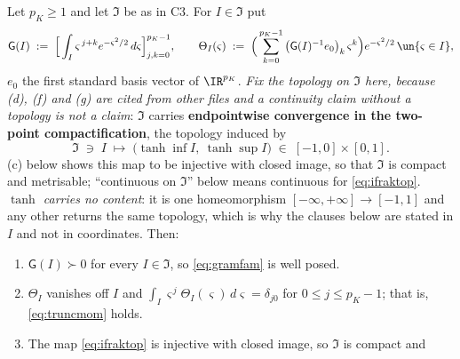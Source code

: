 \begin{lemma}\label{lem:bdryfam}
Let $p_K\ge1$ and let $\mathfrak I$ be as in C3. For $I\in\mathfrak I$ put
\begin{equation}\label{eq:gramfam}
\mathsf G(I)\;:=\;\Big[\int_I\varsigma^{\,j+k}e^{-\varsigma^{2}/2}\,d\varsigma\Big]_{j,k=0}^{p_K-1},
\qquad
\Theta_I(\varsigma)\;:=\;\Big(\sum_{k=0}^{p_K-1}\big(\mathsf G(I)^{-1}e_0\big)_k\,\varsigma^{k}\Big)
e^{-\varsigma^{2}/2}\,\un\{\varsigma\in I\},
\end{equation}
$e_0$ the first standard basis vector of $\IR^{p_K}$. \emph{Fix the topology on $\mathfrak I$ here,
because \textup{(d)}, \textup{(f)} and \textup{(g)} are cited from other files and a continuity claim
without a topology is not a claim}: $\mathfrak I$ carries \textbf{endpointwise convergence in the
two-point compactification}, the topology induced by
\begin{equation}\label{eq:ifraktop}
\mathfrak I\;\ni\;I\;\longmapsto\;\big(\tanh\inf I,\ \tanh\sup I\big)\;\in\;[-1,0]\times[0,1] .
\end{equation}
\textup{(c)} below shows this map to be injective with closed image, so that $\mathfrak I$ is compact
and metrisable; ``continuous on $\mathfrak I$'' below means continuous for \eqref{eq:ifraktop}.
\emph{$\tanh$ carries no content}: it is one homeomorphism $[-\infty,+\infty]\to[-1,1]$ and any other
returns the same topology, which is why the clauses below are stated in $I$ and not in coordinates.
Then:
\begin{enumerate}
\item[(a)] $\mathsf G(I)\succ0$ for every $I\in\mathfrak I$, so \eqref{eq:gramfam} is well posed.
\item[(b)] $\Theta_I$ vanishes off $I$ and $\int_I\varsigma^{\,j}\Theta_I(\varsigma)\,d\varsigma=\delta_{j0}$
for $0\le j\le p_K-1$; that is, \eqref{eq:truncmom} holds.
\item[(c)] The map \eqref{eq:ifraktop} is injective with closed image, so $\mathfrak I$ is compact and

\end{enumerate}
\end{lemma}
